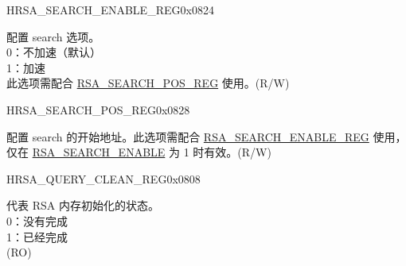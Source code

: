 \begin{register}{H}{RSA\_SEARCH\_ENABLE\_REG}{0x0824}\label{regdesc:RSASEARCHENABLEREG}
%
%
\regnewline%
\begin{regdesc}\begin{reglist}
\label{fielddesc:RSASEARCHENABLE}\item [RSA\_SEARCH\_ENABLE] 配置 search 选项。\\
0：不加速（默认）\\
1：加速\\
此选项需配合 \hyperref[regdesc:RSASEARCHPOSREG]{RSA\_SEARCH\_POS\_REG} 使用。(R/W)
\end{reglist}\end{regdesc}
\end{register}


\begin{register}{H}{RSA\_SEARCH\_POS\_REG}{0x0828}\label{regdesc:RSASEARCHPOSREG}
%
%
\regnewline%
\begin{regdesc}\begin{reglist}
\label{fielddesc:RSASEARCHPOS}\item [RSA\_SEARCH\_POS] 配置 search 的开始地址。此选项需配合 \hyperref[regdesc:RSASEARCHENABLEREG]{RSA\_SEARCH\_ENABLE\_REG} 使用，仅在 \hyperref[fielddesc:RSASEARCHENABLE]{RSA\_SEARCH\_ENABLE} 为 1 时有效。(R/W)
\end{reglist}\end{regdesc}
\end{register}


\begin{register}{H}{RSA\_QUERY\_CLEAN\_REG}{0x0808}\label{regdesc:RSAQUERYCLEANREG}
%
%
\regnewline%
\begin{regdesc}\begin{reglist}
\label{fielddesc:RSAQUERYCLEAN}\item [RSA\_QUERY\_CLEAN] 代表 RSA 内存初始化的状态。\\
0：没有完成\\
1：已经完成\\
 (RO)
\end{reglist}\end{regdesc}
\end{register}


